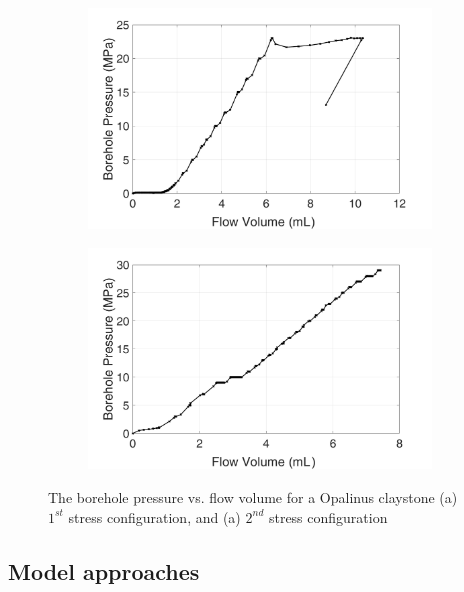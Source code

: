 \begin{figure}[!ht]
\begin{subfigure}[c]{0.48\textwidth}
\includegraphics[width=1\textwidth]{figures/Amir_Percolation_Flow_a.png}
\subcaption{}
\label{fig:Amir_Percolation_Flow_a}
\end{subfigure}
\hfill
\begin{subfigure}[c]{0.48\textwidth}
\includegraphics[width=1\textwidth]{figures/Amir_Percolation_Flow_b.png}
\subcaption{}
\label{fig:Amir_Percolation_Flow_b}
\end{subfigure}
\caption{The borehole pressure vs. flow volume for a Opalinus claystone (a) $1^{st}$ stress configuration, and (a) $2^{nd}$ stress configuration}
\end{figure}

\subsection{Model approaches}
